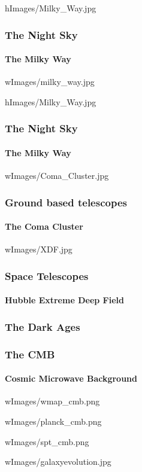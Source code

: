 \begin{frameb}{h}{Images/Milky_Way.jpg} 
  \frametitle{The Night Sky}
  \framesubtitle{The Milky Way}
\end{frameb}



\begin{frameb}{w}{Images/milky_way.jpg}
\end{frameb}


\begin{frameb}{h}{Images/Milky_Way.jpg} 
  \frametitle{The Night Sky}
  \framesubtitle{The Milky Way}

\end{frameb}

%
%

\begin{frameb}{w}{Images/Coma_Cluster.jpg} 
  \frametitle{Ground based telescopes}
  \framesubtitle{The Coma Cluster}

\end{frameb}


\begin{frameb}{w}{Images/XDF.jpg} 
  \frametitle{Space Telescopes}
  \framesubtitle{Hubble Extreme Deep Field}
\end{frameb}

\begin{frame}
  \frametitle{The Dark Ages}
\end{frame}

{%
  \begin{frame}
    \frametitle{The CMB}
    \framesubtitle{Cosmic Microwave Background}
  \end{frame}
}
\begin{frameb}{w}{Images/wmap_cmb.png} 
\end{frameb}
\begin{frameb}{w}{Images/planck_cmb.png} 
\end{frameb}
\begin{frameb}{w}{Images/spt_cmb.png} 
\end{frameb}

\begin{frameb}{w}{Images/galaxyevolution.jpg}
\end{frameb}

